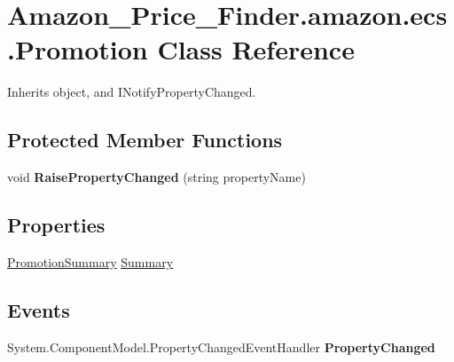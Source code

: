\hypertarget{class_amazon___price___finder_1_1amazon_1_1ecs_1_1_promotion}{\section{Amazon\-\_\-\-Price\-\_\-\-Finder.\-amazon.\-ecs.\-Promotion Class Reference}
\label{class_amazon___price___finder_1_1amazon_1_1ecs_1_1_promotion}
}


 




Inherits object, and I\-Notify\-Property\-Changed.

\subsection*{Protected Member Functions}
\begin{DoxyCompactItemize}
\item 
\hypertarget{class_amazon___price___finder_1_1amazon_1_1ecs_1_1_promotion_a88e7fd150710d4faf4c6238edb67a4bf}{void {\bfseries Raise\-Property\-Changed} (string property\-Name)}\label{class_amazon___price___finder_1_1amazon_1_1ecs_1_1_promotion_a88e7fd150710d4faf4c6238edb67a4bf}

\end{DoxyCompactItemize}
\subsection*{Properties}
\begin{DoxyCompactItemize}
\item 
\hypertarget{class_amazon___price___finder_1_1amazon_1_1ecs_1_1_promotion_ae9f51d9583cb49ba0bbcd63156e65304}{\hyperlink{class_amazon___price___finder_1_1amazon_1_1ecs_1_1_promotion_summary}{Promotion\-Summary} \hyperlink{class_amazon___price___finder_1_1amazon_1_1ecs_1_1_promotion_ae9f51d9583cb49ba0bbcd63156e65304}{Summary}}\label{class_amazon___price___finder_1_1amazon_1_1ecs_1_1_promotion_ae9f51d9583cb49ba0bbcd63156e65304}

\begin{DoxyCompactList}\small\item\em \end{DoxyCompactList}\end{DoxyCompactItemize}
\subsection*{Events}
\begin{DoxyCompactItemize}
\item 
\hypertarget{class_amazon___price___finder_1_1amazon_1_1ecs_1_1_promotion_ac3babd28cb74f3971ff08c76467c6b2c}{System.\-Component\-Model.\-Property\-Changed\-Event\-Handler {\bfseries Property\-Changed}}\label{class_amazon___price___finder_1_1amazon_1_1ecs_1_1_promotion_ac3babd28cb74f3971ff08c76467c6b2c}

\end{DoxyCompactItemize}


